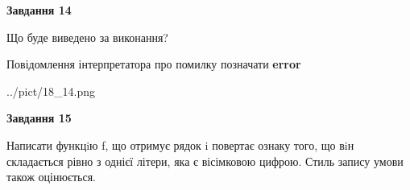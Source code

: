 \documentclass[11pt, ukrainian]{article}
\begin{document}
{\begin {large}
{\begin {center}\textbf{Завдання 14}\end {center}}\par
Що буде виведено за виконання? \par
Повідомлення інтерпретатора про помилку позначати \textbf{error}

\begin{center}
	{../pict/18_14.png}
\end{center}
\newpage

{\begin {center}\textbf{Завдання 15}\end {center}}\par

Написати функцiю f, що отримує рядок i повертає ознаку того, що вiн складається рівно з однієї літери, яка є вісімковою цифрою. Стиль запису умови також оцінюється.\par
\newpage

\end {large}}
\end{document}

